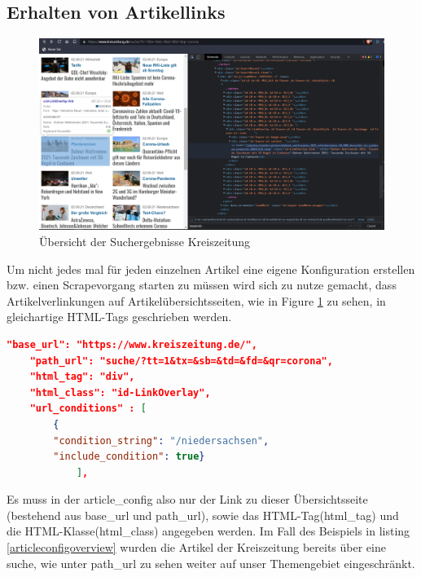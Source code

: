 \documentclass[12pt,oneside,a4paper,parskip]{scrbook}
\begin{document}
\subsection{Erhalten von Artikellinks}
\begin{figure}[h]
\caption{Übersicht der Suchergebnisse Kreiszeitung}
\label{articlelist}
\centering
\includegraphics[scale=0.4]{articles_list.png}
\end{figure}

Um nicht jedes mal für jeden einzelnen Artikel eine eigene Konfiguration erstellen bzw. einen Scrapevorgang starten zu müssen wird sich zu nutze gemacht, dass Artikelverlinkungen auf Artikelübersichtsseiten, wie in Figure \ref {articlelist} zu sehen, in gleichartige HTML-Tags geschrieben werden.

\begin{lstlisting}[caption=article\_config für Übersichtsseite,label=articleconfigoverview,language=json]
    "base_url": "https://www.kreiszeitung.de/",
    "path_url": "suche/?tt=1&tx=&sb=&td=&fd=&qr=corona",
    "html_tag": "div",
    "html_class": "id-LinkOverlay",
    "url_conditions" : [
        {
        "condition_string": "/niedersachsen",
        "include_condition": true}
        	],
\end{lstlisting}

Es muss in der article\_config also nur der Link zu dieser Übersichtsseite (bestehend aus base\_url und path\_url), sowie das HTML-Tag(html\_tag) und die HTML-Klasse(html\_class) angegeben werden. Im Fall des Beispiels in listing \ref{articleconfigoverview} wurden die Artikel der Kreiszeitung bereits über eine suche, wie unter path\_url zu sehen weiter auf unser Themengebiet eingeschränkt.
\pagebreak
\end{document}
